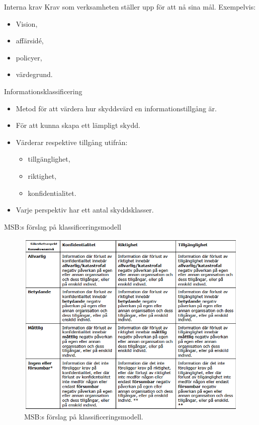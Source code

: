 \documentclass{beamer}
\begin{document}
\begin{frame}{Interna krav}
  Krav som verksamheten ställer upp för att nå sina mål.
  Exempelvis:
  \begin{itemize}
    \item Vision,
    \item affärsidé,
    \item policyer,
    \item värdegrund.
  \end{itemize}
\end{frame}

\begin{frame}{Informationsklassificering}
  \begin{itemize}
    \item Metod för att värdera hur skyddsvärd en informationstillgång är.

    \item För att kunna skapa ett lämpligt skydd.

    \item Värderar respektive tillgång utifrån:
      \begin{itemize}
        \item tillgänglighet,
        \item riktighet,
        \item konfidentialitet.
      \end{itemize}

    \item Varje perspektiv har ett antal skyddsklasser.

  \end{itemize}
\end{frame}

\begin{frame}{MSB:s förslag på klassificeringsmodell}
  \begin{figure}
    \includegraphics[height=0.7\textheight]{msb-klassificering.png}
    \caption{MSB:s förslag på klassificeringsmodell.}
  \end{figure}
\end{frame}
\end{document}
